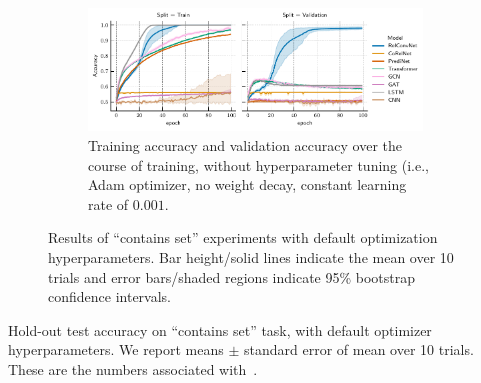 \begin{figure}[ht]
    \begin{subfigure}[t]{0.97\textwidth}
        \centering
        \includegraphics[width=0.975\textwidth]{figs/experiments/contains_set_training_curves.pdf}
        \caption{Training accuracy and validation accuracy over the course of training, without hyperparameter tuning (i.e., Adam optimizer, no weight decay, constant learning rate of $0.001$.}\label{fig:contains_set_training_curves_notuning}
    \end{subfigure}
    \caption{Results of ``contains set'' experiments with default optimization hyperparameters. Bar height/solid lines indicate the mean over 10 trials and error bars/shaded regions indicate 95\% bootstrap confidence intervals.}\label{fig:contains_set_experiment_notuning}
    \vskip-5pt
\end{figure}

\begin{table}[H]
    \centering
    
    \caption{Hold-out test accuracy on ``contains set'' task, with default optimizer hyperparameters. We report means $\pm$ standard error of mean over 10 trials. These are the numbers associated with~.}\label{tab:set_acc_notuning}
\end{table}


\null
\vfill

